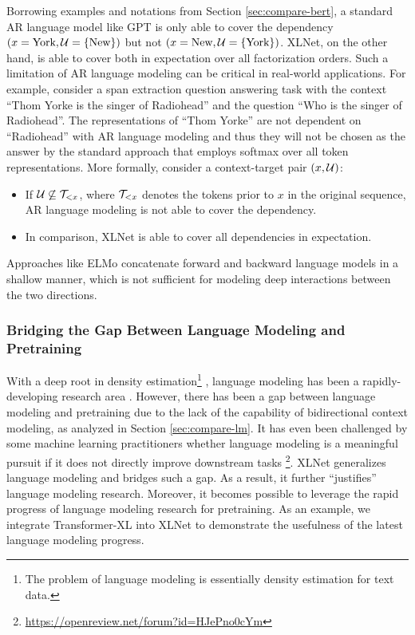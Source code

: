 Borrowing examples and notations from Section \ref{sec:compare-bert}, a standard AR language model like GPT \cite{radford2018improving} is only able to cover the dependency $(x = \text{York}, \mathcal{U} = \{\text{New}\})$ but not $(x = \text{New}, \mathcal{U} = \{\text{York}\})$. XLNet, on the other hand, is able to cover both in expectation over all factorization orders. Such a limitation of AR language modeling can be critical in real-world applications. For example, consider a span extraction question answering task with the context ``Thom Yorke is the singer of Radiohead'' and the question ``Who is the singer of Radiohead''. The representations of ``Thom Yorke'' are not dependent on ``Radiohead'' with AR language modeling and thus they will not be chosen as the answer by the standard approach that employs softmax over all token representations. More formally, consider a context-target pair $(x, \mathcal{U})$:
\begin{itemize}[leftmargin=*,topsep=0em,itemsep=0em]
	\item If $\mathcal{U} \not\subseteq \mathcal{T}_{< x}$, where $\mathcal{T}_{<x}$ denotes the tokens prior to $x$ in the original sequence, AR language modeling is not able to cover the dependency.
	\item In comparison, XLNet is able to cover all dependencies in expectation.
\end{itemize}

Approaches like ELMo \cite{peters2018deep} concatenate forward and backward language models in a shallow manner, which is not sufficient for modeling deep interactions between the two directions.

\subsubsection{Bridging the Gap Between Language Modeling and Pretraining}

With a deep root in density estimation\footnote{The problem of language modeling is essentially density estimation for text data.} \cite{bengio2000modeling,uria2016neural,oord2016pixel}, language modeling has been a rapidly-developing research area \cite{dai2019transformer,al2018character,baevski2018adaptive}. However, there has been a gap between language modeling and pretraining due to the lack of the capability of bidirectional context modeling, as analyzed in Section \ref{sec:compare-lm}. It has even been challenged by some machine learning practitioners whether language modeling is a meaningful pursuit if it does not directly improve downstream tasks \footnote{\url{https://openreview.net/forum?id=HJePno0cYm}}. XLNet generalizes language modeling and bridges such a gap. As a result, it further ``justifies'' language modeling research. Moreover, it becomes possible to leverage the rapid progress of language modeling research for pretraining. As an example, we integrate Transformer-XL into XLNet to demonstrate the usefulness of the latest language modeling progress.


